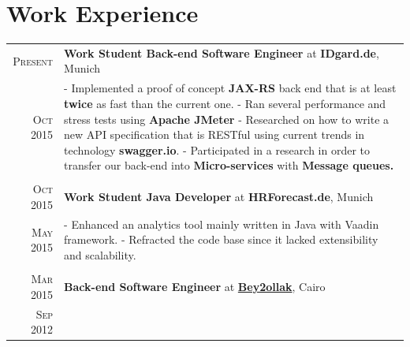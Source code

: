 \documentclass[a4paper,13pt]{article}
\begin{document}
\begin{adjustwidth}{-3cm}{}
\begin{figure}
\end{figure}



\end{adjustwidth}



\section{Work Experience}
\begin{adjustwidth}{-3cm}{}
\begin{tabular}{r|p{17.5cm}}

		
\textsc{Present} & \textbf{Work Student Back-end Software Engineer} at \textbf{IDgard.de}, Munich \\
\textsc{Oct 2015} & \footnotesize{
	- Implemented a proof of concept \textbf{JAX-RS} back end that is at least \textbf{twice} as fast than the current one.\newline
	- Ran several performance and stress tests using \textbf{Apache JMeter} \newline
	- Researched on how to write a new API specification that is RESTful using current trends in technology \textbf{swagger.io}. \newline
	- Participated in a research in order to transfer our back-end into \textbf{Micro-services} with \textbf{Message queues.}
}
\\ \multicolumn{2}{c}{}\\


\textsc{Oct 2015} & \textbf{Work Student Java Developer} at \textbf{HRForecast.de}, Munich \\
\textsc{May 2015} & \footnotesize{ - Enhanced an analytics tool mainly written in Java with Vaadin framework. \newline
- Refracted the code base since it lacked extensibility and scalability.
} \\ 
\multicolumn{2}{c}{} \\


\textsc{Mar 2015} & \textbf{Back-end Software Engineer} at \href{http://desktop.bey2ollak.com/features-mentions/}{\textbf{Bey2ollak}}, Cairo \\
\textsc{Sep 2012} & 


\end{tabular}
\end{adjustwidth}
\end{document}
